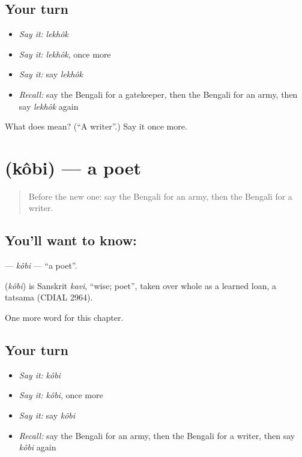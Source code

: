 \subsection*{Your turn}
\begin{itemize}
\raggedright
  \item \emph{Say it:} \emph{lekhôk}
  \item \emph{Say it:} \emph{lekhôk}, once more
  \item \emph{Say it:} say \emph{lekhôk}
  \item \emph{Recall:} say the Bengali for a gatekeeper, then the Bengali for an army, then say \emph{lekhôk} again
\end{itemize}

\begin{tcolorbox}[breakable,colback=teal!4,colframe=teal!35!black,title={Before you move on}]
What does  mean? (\textquotedblleft{}A writer\textquotedblright{}.) Say it once more.
\end{tcolorbox}
\section[\texorpdfstring{\bn{কবি} (kôbi)}{কবি (kôbi)}]{ (kôbi) — a poet}

\label{lesson:BN-C262-kobi}



\begin{quote}
Before the new one: say the Bengali for an army, then the Bengali for a writer.
\end{quote}

\subsection*{You'll want to know: }
\textbf{} — \emph{kôbi} — \textquotedblleft{}a poet\textquotedblright{}.

\begin{cousinweb}
\textbf{} (\emph{kôbi}) is Sanskrit \emph{kavi}, \textquotedblleft{}wise; poet\textquotedblright{}, taken over whole as a learned loan, a tatsama (CDIAL 2964).
\end{cousinweb}

\begin{grammarlens}[title={What you've built}]
One more word for this chapter.
\end{grammarlens}

\subsection*{Your turn}
\begin{itemize}
\raggedright
  \item \emph{Say it:} \emph{kôbi}
  \item \emph{Say it:} \emph{kôbi}, once more
  \item \emph{Say it:} say \emph{kôbi}
  \item \emph{Recall:} say the Bengali for an army, then the Bengali for a writer, then say \emph{kôbi} again
\end{itemize}

